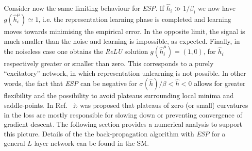 \documentclass[5p]{elsarticle}
\begin{document}
Consider now the same limiting behaviour for {\it ESP}. If $\hat{h}_i \gg 1/\beta_i$ we now have $g(\hat{h}^{\mu}_i)\simeq 1$, i.e. the representation learning phase is completed and learning moves towards minimising the empirical error. In the opposite limit, the signal is much smaller than the noise and learning is impossible, as expected. Finally, in the noiseless case one obtains the {\it ReLU} solution $g(\hat{h}^{\mu}_i) = (1, 0) $, for $\hat{h}_i $ respectively greater or smaller than zero. This corresponds to a purely ``excitatory'' network, in which representation unlearning is not possible. In other words, the fact that {\it ESP} can be negative for $\sigma(\hat{h})/\beta <\hat{h}<0$ allows for greater flexibility and the possibility to avoid plateaus surrounding local minima and saddle-points. In Ref.~\cite{dauphin} it was proposed that plateaus of zero (or small) curvatures in the loss are mostly responsible for slowing down or preventing convergence of gradient descent. The following section provides a numerical analysis to support this picture. Details of the the back-propagation algorithm with {\it ESP} for a general $L$ layer network can be found in the SM.
%
\end{document}
